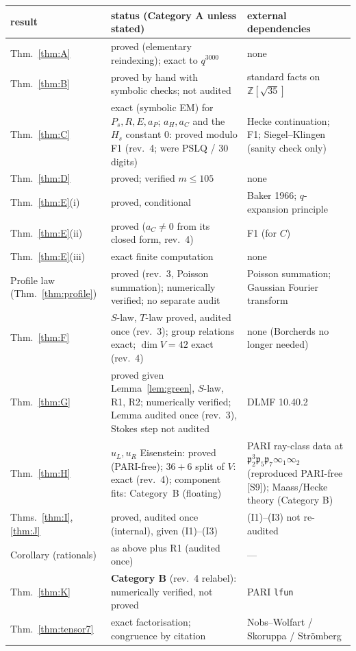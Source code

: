 \documentclass[11pt]{article}
\theoremstyle{definition}
\newcommand{\Z}{\mathbb{Z}}
\newcommand{\fp}{\mathfrak{p}}
\newcommand{\src}[1]{\textup{[S#1]}}
\begin{document}
\begin{center}\small
\begin{longtable}{p{2.6cm}p{6.6cm}p{5.6cm}}\toprule
result & status (Category A unless stated) & external dependencies\\\midrule\endhead
Thm.~\ref{thm:A} & proved (elementary reindexing); exact to $q^{3000}$ & none\\
Thm.~\ref{thm:B} & proved by hand with symbolic checks; not audited & standard facts on $\Z[\sqrt{35}]$\\
Thm.~\ref{thm:C} & exact (symbolic EM) for $P_s,R,E,a_P$; $a_H,a_C$ and the $H_s$ constant $0$: proved modulo F1 (rev.~4; were PSLQ / 30 digits) & Hecke continuation; F1; Siegel--Klingen (sanity check only)\\
Thm.~\ref{thm:D} & proved; verified $m\le105$ & none\\
Thm.~\ref{thm:E}(i) & proved, conditional & Baker 1966; $q$-expansion principle\\
Thm.~\ref{thm:E}(ii) & proved ($a_C\neq0$ from its closed form, rev.~4) & F1 (for $C$)\\
Thm.~\ref{thm:E}(iii) & exact finite computation & none\\
Profile law (Thm.~\ref{thm:profile}) & proved (rev.~3, Poisson summation); numerically verified; no separate audit & Poisson summation; Gaussian Fourier transform\\
Thm.~\ref{thm:F} & $S$-law, $T$-law proved, audited once (rev.~3); group relations exact; $\dim V=42$ exact (rev.~4) & none (Borcherds no longer needed)\\
Thm.~\ref{thm:G} & proved given Lemma~\ref{lem:green}, $S$-law, R1, R2; numerically verified; Lemma audited once (rev.~3), Stokes step not audited & DLMF 10.40.2\\
Thm.~\ref{thm:H} & $u_L,u_R$ Eisenstein: proved (PARI-free); $36+6$ split of $V$: exact (rev.~4); component fits: Category~B (floating) & PARI ray-class data at $\fp_2^3\fp_5\fp_7\infty_1\infty_2$ (reproduced PARI-free \src{9}); Maass/Hecke theory (Category B)\\
Thms.~\ref{thm:I}, \ref{thm:J} & proved, audited once (internal), given (I1)--(I3) & (I1)--(I3) not re-audited\\
Corollary (rationals) & as above plus R1 (audited once) & ---\\
Thm.~\ref{thm:K} & \textbf{Category B} (rev.~4 relabel): numerically verified, not proved & PARI \texttt{lfun}\\
Thm.~\ref{thm:tensor7} & exact factorisation; congruence by citation & Nobs--Wolfart / Skoruppa / Str\"omberg\\

\end{longtable}
\end{center}
\end{document}
